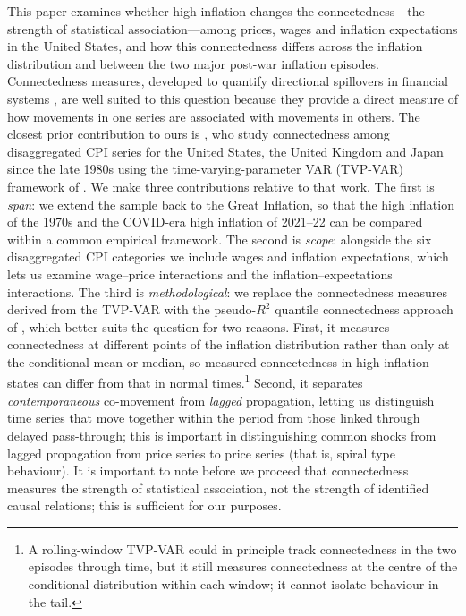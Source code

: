 \documentclass{article}
\begin{document}
This paper examines whether high inflation changes the connectedness---the strength
of statistical association---among prices, wages and inflation expectations in the
United States, and how this connectedness differs across the inflation distribution and
between the two major post-war inflation episodes. Connectedness measures, developed to quantify directional spillovers
in financial systems \autocite{dieboldyilmaz2012}, are well suited to this question
because they provide a direct measure of how movements in one series are associated
with movements in others. The closest prior contribution to ours is
\textcite{stenfors2026decomposing}, who study connectedness among disaggregated CPI
series for the United States, the United Kingdom and Japan since the late 1980s using
the time-varying-parameter VAR (TVP-VAR) framework of \textcite{antonakakis2020}. We
make three contributions relative to that work. The first is \emph{span}: we extend
the sample back to the Great Inflation, so that the high inflation of the 1970s and the
COVID-era  high inflation of 2021--22 can be compared within a common empirical framework. The
second is \emph{scope}: alongside the six disaggregated CPI categories we include
wages and inflation expectations, which lets us examine wage--price interactions and the
inflation--expectations interactions. The third is \emph{methodological}: we replace the connectedness measures derived from the TVP-VAR with the
pseudo-$R^2$ quantile connectedness approach of \textcite{shahzadetal}, which better suits the
question for two reasons. First, it measures connectedness at different points of the
inflation distribution rather than only at the conditional mean or median, so measured connectedness in high-inflation states can differ from that in normal
times.\footnote{A rolling-window TVP-VAR could in principle track connectedness in the two episodes
through time, but it still measures connectedness at the centre of the conditional
distribution within each window; it cannot isolate behaviour in the tail.} Second, it
separates \emph{contemporaneous} co-movement from \emph{lagged} propagation, letting us
distinguish time series that move together within the period from those linked through
delayed pass-through; this is important in distinguishing common shocks from lagged propagation from price series to price series (that is, spiral type behaviour).  It is important to note before we proceed that connectedness measures the strength of statistical
association, not the strength of identified causal relations; this is sufficient for our purposes.
\end{document}
